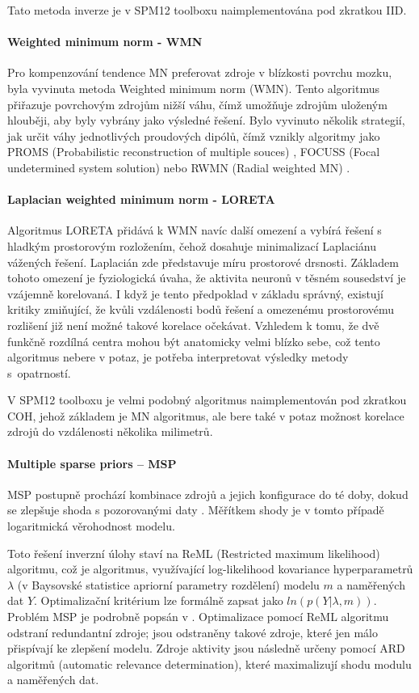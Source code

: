 Tato metoda inverze je v SPM12 toolboxu naimplementována pod zkratkou IID.

\paragraph{Weighted minimum norm - WMN}
Pro kompenzování tendence MN preferovat zdroje v blízkosti povrchu mozku, byla vyvinuta metoda Weighted minimum norm (WMN). Tento algoritmus přiřazuje povrchovým zdrojům nižší váhu, čímž umožňuje zdrojům uloženým hlouběji, aby byly vybrány jako výsledné řešení. Bylo vyvinuto několik strategií, jak určit váhy jednotlivých proudových dipólů, čímž vznikly algoritmy jako PROMS (Probabilistic reconstruction of multiple souces) \cite{44}, FOCUSS (Focal undetermined system solution) \cite{45} nebo RWMN (Radial weighted MN) \cite{46}.

\paragraph{Laplacian weighted minimum norm - LORETA}
Algoritmus LORETA přidává k WMN navíc další omezení a vybírá řešení s hladkým prostorovým rozložením, čehož dosahuje minimalizací Laplaciánu vážených řešení. Laplacián zde představuje míru prostorové drsnosti. Základem tohoto omezení je fyziologická úvaha, že aktivita neuronů v těsném sousedství je vzájemně korelovaná. I když je tento předpoklad v základu správný, existují kritiky zmiňující, že kvůli vzdálenosti bodů řešení a omezenému prostorovému rozlišení již není možné takové korelace očekávat. Vzhledem k tomu, že dvě funkčně rozdílná centra mohou být anatomicky velmi blízko sebe, což tento algoritmus nebere v potaz, je potřeba interpretovat výsledky metody s~opatrností. \cite{47,29}

V SPM12 toolboxu je velmi podobný algoritmus naimplementován pod zkratkou COH, jehož základem je MN algoritmus, ale bere také v potaz možnost korelace zdrojů do vzdálenosti několika milimetrů. \cite{28}

\paragraph{Multiple sparse priors – MSP}
MSP postupně prochází kombinace zdrojů a jejich konfigurace do té doby, dokud se zlepšuje shoda s pozorovanými daty \cite{28}. Měřítkem shody je v tomto případě logaritmická věrohodnost modelu.

Toto řešení inverzní úlohy staví na ReML (Restricted maximum likelihood) algoritmu, což je algoritmus, využívající log-likelihood kovariance hyperparametrů $\lambda$ (v Baysovské statistice apriorní parametry rozdělení) modelu $m$ a naměřených dat $Y$. Optimalizační kritérium lze formálně zapsat jako $ln(p(Y|\lambda,m))$. Problém MSP je podrobně popsán v \cite{51}. Optimalizace pomocí ReML algoritmu odstraní redundantní zdroje; jsou odstraněny takové zdroje, které jen málo přispívají ke zlepšení modelu. Zdroje aktivity jsou následně určeny pomocí ARD algoritmů (automatic relevance determination), které maximalizují shodu modulu a naměřených dat. \cite{52}

